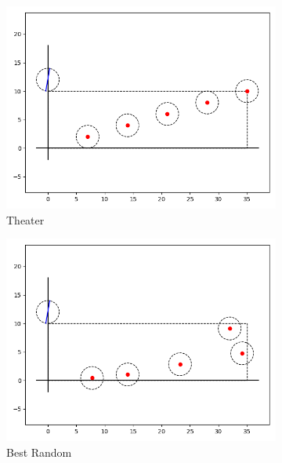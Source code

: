 \documentclass[12pt]{article}
\begin{document}
\begin{figure}
\medskip
\begin{subfigure}{.33\textwidth}
    \centering
    \includegraphics[width=\textwidth]{theater-layout.png}
    \caption{Theater}
\end{subfigure}\hfil %
\begin{subfigure}{.33\textwidth}
    \includegraphics[width=\textwidth]{random-layout.png}
    \caption{Best Random}
\end{subfigure}\hfil %
\begin{subfigure}{.33\textwidth}

\end{subfigure}
\end{figure}
\end{document}
